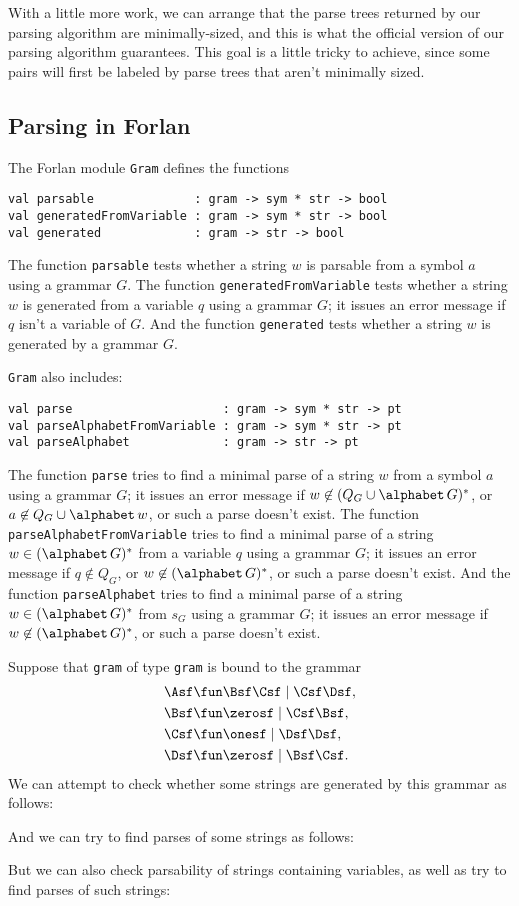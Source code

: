With a little more work, we can arrange that the parse trees returned by
our parsing algorithm are minimally-sized, and this is what the
official version of our parsing algorithm guarantees.  This goal is a
little tricky to achieve, since some pairs will first be labeled by
parse trees that aren't minimally sized.

\subsection{Parsing in Forlan}

The Forlan module \texttt{Gram} defines the functions
\begin{verbatim}
val parsable              : gram -> sym * str -> bool
val generatedFromVariable : gram -> sym * str -> bool
val generated             : gram -> str -> bool
\end{verbatim}
The function \texttt{parsable} tests whether a string $w$ is parsable
from a symbol $a$ using a grammar $G$.  The function
\texttt{generatedFromVariable} tests whether a string $w$ is generated
from a variable $q$ using a grammar $G$; it issues an error message if
$q$ isn't a variable of $G$.  And the function \texttt{generated}
tests whether a string $w$ is generated by a grammar $G$.

\texttt{Gram} also includes:
\begin{verbatim}
val parse                     : gram -> sym * str -> pt
val parseAlphabetFromVariable : gram -> sym * str -> pt
val parseAlphabet             : gram -> str -> pt
\end{verbatim}
The function \texttt{parse} tries to find a minimal parse of a string
$w$ from a symbol $a$ using a grammar $G$; it issues an error message
if $w\not\in(Q_G\cup\alphabet\,G)^*$, or $a\not\in
Q_G\cup\alphabet\,w$, or such a parse doesn't exist.  The function
\texttt{parseAlphabetFromVariable} tries to find a minimal parse of a
string $w\in(\alphabet\,G)^*$ from a variable $q$ using a grammar $G$;
it issues an error message if $q\not\in Q_G$, or
$w\not\in(\alphabet\,G)^*$, or such a parse doesn't exist.  And the
function \texttt{parseAlphabet} tries to find a minimal parse of a
string $w\in(\alphabet\,G)^*$ from $s_G$ using a grammar $G$; it
issues an error message if $w\not\in(\alphabet\,G)^*$, or such a parse
doesn't exist.

Suppose that \texttt{gram} of type \texttt{gram} is bound to the grammar
\begin{align*}
\Asf &\fun \Bsf\Csf\mid \Csf\Dsf , \\
\Bsf &\fun \zerosf\mid \Csf\Bsf , \\
\Csf &\fun \onesf\mid \Dsf\Dsf , \\
\Dsf &\fun \zerosf\mid \Bsf\Csf .
\end{align*}
We can attempt to check whether some strings are generated by this grammar
as follows:

And we can try to find parses of some strings as follows:

But we can also check parsability of strings containing variables, as well
as try to find parses of such strings:


